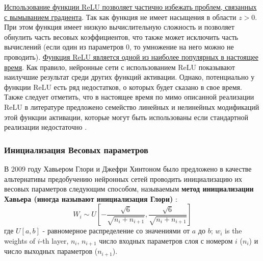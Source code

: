 \documentclass[12pt]{article}
\begin{document}
\begin{sloppypar}
\uline{Использование функции ReLU позволяет частично избежать проблем, связанных с  вымыванием градиента}. Так как функция не имеет насыщения в области $z>0$. При этом функция имеет низкую вычислительную сложность и позволяет обнулить часть весовых коэффициентов, что также может исключить часть вычислений (если один из параметров 0, то умножение на него можно не проводить). \uline{Функция ReLU является одной из наиболее популярных в настоящее время}. Как правило, нейронные сети с использованием ReLU показывают наилучшие результат среди других функций активации. Однако, потенциально у функции ReLU есть ряд недостатков, о которых будет сказано в свое время. Также следует отметить, что в настоящее время по мимо описанной реализации ReLU в литературе предложено семейство линейных и нелинейных модификаций этой функции активации, которые могут быть использованы если стандартной реализации недостаточно \cite{goyal2020activation}.


\subsubsection{Инициализация Весовых параметров}
В 2009 году Хавьером Глори и Джефри Хинтоном было предложено в качестве альтернативы предобучению нейронных сетей проводить инициализацию их весовых параметров следующим способом, называемым \textbf{метод инициализации Хавьера (иногда называют инициализация Глори)} \cite{glorot2010understanding}:
\begin{equation}
    \label{ch1:eqn:xavier}
    W_i\sim U\left[-\frac{\sqrt{6}}{\sqrt{n_{i}+n_{i+1} }},\frac{\sqrt{6}}{\sqrt{n_{i}+n_{i+1}}}\right]
\end{equation}
где $U[a,b]$ - равномерное распределение со значениями от $a$ до $b$; $w_i$ is the weights of $i$-th layer, $n_{i}$, $n_{i+1}$ число входных параметров слоя с номером $i$ ($n_{i}$) и число выходных параметров ($n_{i+1}$). 


\end{sloppypar}
\end{document}
